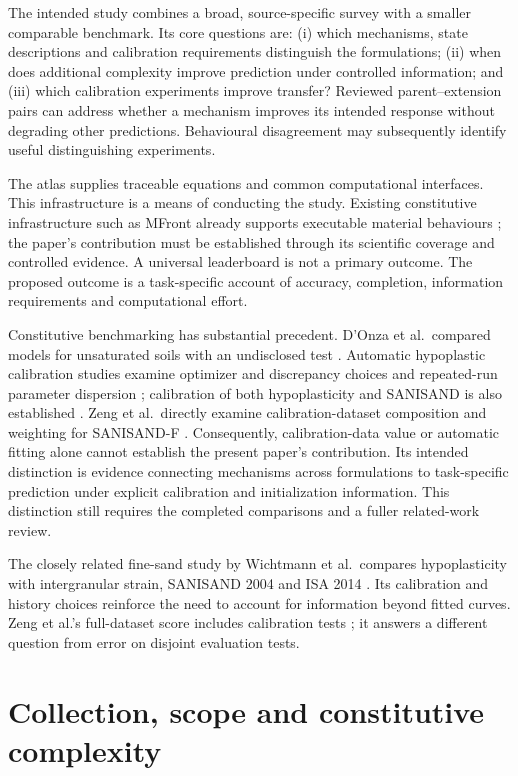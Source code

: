 \documentclass[11pt,a4paper]{article}
\begin{document}
The intended study combines a broad, source-specific survey with a smaller comparable benchmark. Its core questions are: (i) which mechanisms, state descriptions and calibration requirements distinguish the formulations; (ii) when does additional complexity improve prediction under controlled information; and (iii) which calibration experiments improve transfer? Reviewed parent--extension pairs can address whether a mechanism improves its intended response without degrading other predictions. Behavioural disagreement may subsequently identify useful distinguishing experiments.

The atlas supplies traceable equations and common computational interfaces. This infrastructure is a means of conducting the study. Existing constitutive infrastructure such as MFront already supports executable material behaviours \cite{mfront}; the paper's contribution must be established through its scientific coverage and controlled evidence. A universal leaderboard is not a primary outcome. The proposed outcome is a task-specific account of accuracy, completion, information requirements and computational effort.

Constitutive benchmarking has substantial precedent. D'Onza et al.\ compared models for unsaturated soils with an undisclosed test \cite{donza2011}. Automatic hypoplastic calibration studies examine optimizer and discrepancy choices and repeated-run parameter dispersion \cite{machacek2022}; calibration of both hypoplasticity and SANISAND is also established \cite{machacek2023}. Zeng et al.\ directly examine calibration-dataset composition and weighting for SANISAND-F \cite{zeng2026}. Consequently, calibration-data value or automatic fitting alone cannot establish the present paper's contribution. Its intended distinction is evidence connecting mechanisms across formulations to task-specific prediction under explicit calibration and initialization information. This distinction still requires the completed comparisons and a fuller related-work review.

The closely related fine-sand study by Wichtmann et al.\ compares hypoplasticity with intergranular strain, SANISAND 2004 and ISA 2014 \cite{wichtmann2019}. Its calibration and history choices reinforce the need to account for information beyond fitted curves. Zeng et al.'s full-dataset score includes calibration tests \cite{zeng2026}; it answers a different question from error on disjoint evaluation tests.

\section{Collection, scope and constitutive complexity}
\end{document}
